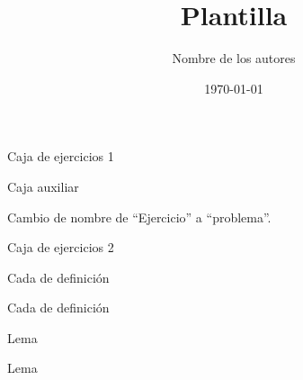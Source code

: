 \documentclass[11pt]{article}
\title{Plantilla}
\author{Nombre de los autores}
\date{\today}
\begin{document}
\maketitle


\begin{exercise}
  Caja de ejercicios 1
\end{exercise}

\begin{exercise*}
  Caja auxiliar
\end{exercise*}

Cambio de nombre de ``Ejercicio'' a ``problema''.

\begin{exercise}
  Caja de ejercicios 2
\end{exercise}

\begin{definition}
  Cada de definición
\end{definition}

\begin{definition*}
  Cada de definición
\end{definition*}

\begin{lemma}
  Lema
\end{lemma}

\begin{lemma*}
  Lema
\end{lemma*}
\end{document}
